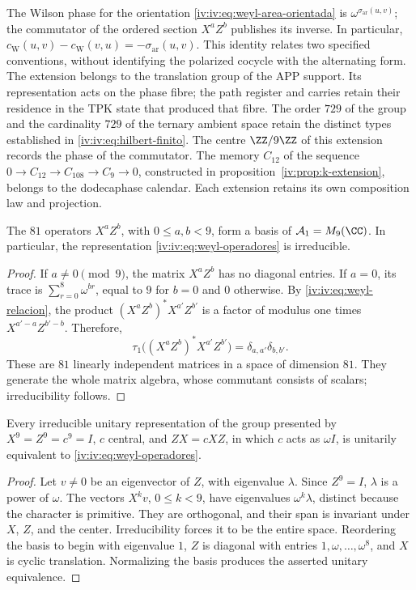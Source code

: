 The Wilson phase for the orientation
\eqref{iv:iv:eq:weyl-area-orientada} is
\(\omega^{\sigma_{\mathrm{ar}}(u,v)}\); the commutator of the
ordered section \(X^aZ^b\) publishes its inverse. In particular,
\(c_{\mathrm W}(u,v)-c_{\mathrm W}(v,u)
=-\sigma_{\mathrm{ar}}(u,v)\).
This identity relates two specified conventions, without identifying
the polarized cocycle with the alternating form. The extension belongs
to the translation group of the APP support. Its representation acts on
the phase fibre; the path register and carries retain
their residence in the TPK state that produced that fibre. The order \(729\)
of the group and the cardinality \(729\) of the ternary ambient space retain the
distinct types established in \eqref{iv:iv:eq:hilbert-finito}.
The centre \(\ZZ/9\ZZ\) of this extension records the phase
of the commutator. The memory \(C_{12}\) of the sequence
\(0\to C_{12}\to C_{108}\to C_9\to0\), constructed in
proposition~\ref{iv:prop:k-extension}, belongs to the dodecaphase
calendar. Each extension retains its own composition law and
projection.

\begin{proposition}
\label{iv:iv:prop:weyl-completo}
The \(81\) operators \(X^aZ^b\), with \(0\leq a,b<9\), form
a basis of \(\mathcal A_1=M_9(\CC)\). In particular, the
representation \eqref{iv:iv:eq:weyl-operadores} is irreducible.
\end{proposition}
\begin{proof}
If \(a\neq0\pmod9\), the matrix \(X^aZ^b\) has no diagonal
entries. If \(a=0\), its trace is
\(\sum_{r=0}^8\omega^{br}\), equal to \(9\) for \(b=0\) and
\(0\) otherwise. By \eqref{iv:iv:eq:weyl-relacion}, the
product \((X^aZ^b)^*X^{a'}Z^{b'}\) is a factor of modulus one
times \(X^{a'-a}Z^{b'-b}\). Therefore,
\[
 \tau_1\bigl((X^aZ^b)^*X^{a'}Z^{b'}\bigr)
 =\delta_{a,a'}\delta_{b,b'}.
\]
These are \(81\) linearly independent matrices in a space of
dimension \(81\). They generate the whole matrix algebra, whose commutant
consists of scalars; irreducibility follows.
\end{proof}

\begin{theorem}
\label{iv:iv:thm:weyl-unicidad}
Every irreducible unitary representation of the group presented by
\(X^9=Z^9=c^9=I\), \(c\) central, and \(ZX=cXZ\), in which
\(c\) acts as \(\omega I\), is unitarily equivalent to
\eqref{iv:iv:eq:weyl-operadores}.
\end{theorem}
\begin{proof}
Let \(v\neq0\) be an eigenvector of \(Z\), with eigenvalue \(\lambda\).
Since \(Z^9=I\), \(\lambda\) is a power of \(\omega\).
The vectors \(X^kv\), \(0\leq k<9\), have eigenvalues
\(\omega^k\lambda\), distinct because the character is primitive.
They are orthogonal, and their span is invariant under \(X\),
\(Z\), and the center. Irreducibility forces it to be the entire
space. Reordering the basis to begin with eigenvalue \(1\),
\(Z\) is diagonal with entries \(1,\omega,\ldots,\omega^8\),
and \(X\) is cyclic translation. Normalizing the basis
produces the asserted unitary equivalence.
\end{proof}

